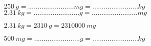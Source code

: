 \begin{questions}
		
	
		\question $ \num{250}\  g =........................mg =........................kg $\\
		
		\question $\num{2.31}\  kg =........................g =........................mg $\\
		\begin{solution}
			$\num{2.31}\  kg = \num{2310}\  g = \num{2310000}\  mg $
		\end{solution}
		
		
		
		
		\question $ \num{500}\  mg =........................g =........................ kg $\\
		
%		
%		
%		
%		
%		
%		

\end{questions}

